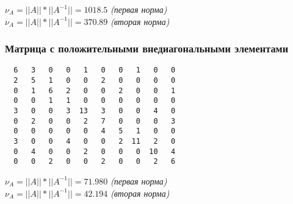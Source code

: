 \documentclass[12pt, a4paper]{article}
\begin{document}
\noindent$\nu_A = ||A||*||A^{-1}|| = 1018.5$ \textit{(первая норма)} \\
\noindent$\nu_A = ||A||*||A^{-1}|| = 370.89$ \textit{(вторая норма)}

\subsubsection{Матрица с положительными внедиагональными элементами}
\begin{verbatim}
  6   3   0   0   1   0   0   1   0   0
  2   5   1   0   0   2   0   0   0   0
  0   1   6   2   0   0   2   0   0   1
  0   0   1   1   0   0   0   0   0   0
  3   0   0   3  13   3   0   0   4   0
  0   2   0   0   2   7   0   0   0   3
  0   0   0   0   0   4   5   1   0   0
  3   0   0   4   0   0   2  11   2   0
  0   4   0   0   2   0   0   0  10   4 
  0   0   2   0   0   2   0   0   2   6 
\end{verbatim}

\noindent$\nu_A = ||A||*||A^{-1}|| = 71.980$ \textit{(первая норма)} \\
\noindent$\nu_A = ||A||*||A^{-1}|| = 42.194$ \textit{(вторая норма)}
\end{document}
